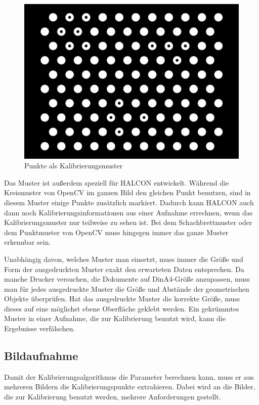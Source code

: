 \begin{figure}[!hbt]
\centering
	\vspace{1ex}
	\includegraphics[scale=0.2]{../images/caltab_hex_10x11}
	\caption[Punkte als Kalibrierungsmuster]{\label{img:caltab_hex_10x11} Punkte als Kalibrierungsmuster}
	\vspace{1ex}
\end{figure}

Das Muster ist außerdem speziell für HALCON entwickelt. Während die Kreismuster von OpenCV im ganzen Bild den gleichen Punkt benutzen, sind in diesem Muster einige Punkte zusätzlich markiert. Dadurch kann HALCON auch dann noch Kalibrierungsinformationen aus einer Aufnahme errechnen, wenn das Kalibrierungsmuster nur teilweise zu sehen ist. Bei dem Schachbrettmuster oder dem Punktmuster von OpenCV muss hingegen immer das ganze Muster erkennbar sein.

Unabhängig davon, welches Muster man einsetzt, muss immer die Größe und Form der ausgedruckten Muster exakt den erwarteten Daten entsprechen. Da manche Drucker versuchen, die Dokumente auf DinA4-Größe anzupassen, muss man für jedes ausgedruckte Muster die Größe und Abstände der geometrischen Objekte überprüfen. Hat das ausgedruckte Muster die korrekte Größe, muss dieses auf eine möglichst ebene Oberfläche geklebt werden. Ein gekrümmtes Muster in einer Aufnahme, die zur Kalibrierung benutzt wird, kann die Ergebnisse verfälschen. 

\subsection{Bildaufnahme} %
\label{sub:bildaufnahme}
Damit der Kalibrierungsalgorithmus die Parameter berechnen kann, muss er aus mehreren Bildern die Kalibrierungspunkte extrahieren. Dabei wird an die Bilder, die zur Kalibrierung benutzt werden, mehrere Anforderungen gestellt. 

